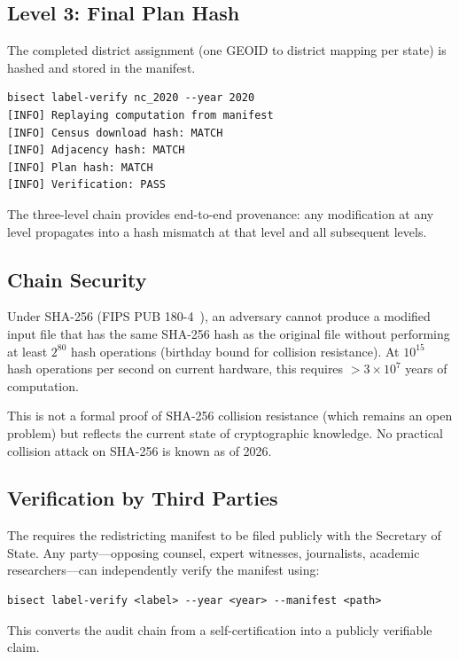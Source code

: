 \subsection{Level 3: Final Plan Hash}

The completed district assignment (one GEOID to district mapping per state)
is hashed and stored in the manifest.

\begin{verbatim}
bisect label-verify nc_2020 --year 2020
[INFO] Replaying computation from manifest
[INFO] Census download hash: MATCH
[INFO] Adjacency hash: MATCH
[INFO] Plan hash: MATCH
[INFO] Verification: PASS
\end{verbatim}

The three-level chain provides end-to-end provenance:
any modification at any level propagates into a hash mismatch at
that level and all subsequent levels.

\subsection{Chain Security}

\begin{theorem}
Under SHA-256 (FIPS PUB 180-4~\citep{fips180}), an adversary cannot
produce a modified input file that has the same SHA-256 hash as the
original file without performing at least $2^{80}$ hash operations
(birthday bound for collision resistance).
At $10^{15}$ hash operations per second on current hardware, this
requires $>3 \times 10^7$ years of computation.
\end{theorem}

This is not a formal proof of SHA-256 collision resistance (which remains
an open problem) but reflects the current state of cryptographic knowledge.
No practical collision attack on SHA-256 is known as of 2026.

\subsection{Verification by Third Parties}

The \dia{} requires the redistricting manifest to be filed publicly
with the Secretary of State.
Any party---opposing counsel, expert witnesses, journalists, academic
researchers---can independently verify the manifest using:
\begin{verbatim}
bisect label-verify <label> --year <year> --manifest <path>
\end{verbatim}
This converts the audit chain from a self-certification into a
publicly verifiable claim.
